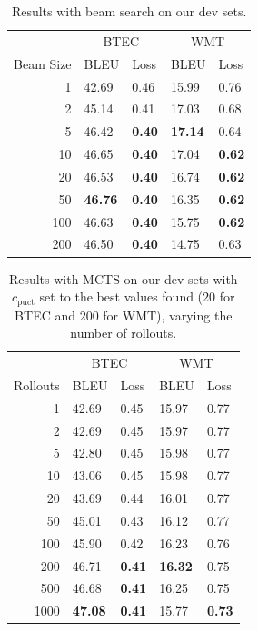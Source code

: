 \documentclass[11pt,a4paper]{article}
\begin{document}
\begin{table}
\centering
\begin{tabular}{r l l l l}
\toprule
& \multicolumn{2}{c}{BTEC} & \multicolumn{2}{c}{WMT} \\
\cmidrule(l{2pt}r{2pt}){2-3}\cmidrule(l{2pt}r{2pt}){4-5}
Beam Size & BLEU & Loss & BLEU & Loss \\
\midrule
1 & 42.69 & 0.46 & 15.99 & 0.76 \\
2 & 45.14 & 0.41 & 17.03 & 0.68 \\
5 & 46.42 & \textbf{0.40} & \textbf{17.14} & 0.64 \\
10 & 46.65 & \textbf{0.40} & 17.04 & \textbf{0.62} \\
20 & 46.53 & \textbf{0.40} & 16.74 & \textbf{0.62} \\
50 & \textbf{46.76} & \textbf{0.40} & 16.35 & \textbf{0.62} \\
100 & 46.63 & \textbf{0.40} & 15.75 & \textbf{0.62} \\
200 & 46.50 & \textbf{0.40} & 14.75 & 0.63 \\
\bottomrule
\end{tabular}
\caption{Results with beam search on our dev sets.}
\label{tab:btec_bs_results}
\end{table}

\begin{table}
\centering
\begin{tabular}{r l l l l}
\toprule
& \multicolumn{2}{c}{BTEC} & \multicolumn{2}{c}{WMT} \\
\cmidrule(l{2pt}r{2pt}){2-3}\cmidrule(l{2pt}r{2pt}){4-5}
Rollouts & BLEU & Loss & BLEU & Loss \\
\midrule
1 & 42.69 & 0.45 & 15.97 & 0.77 \\
2 & 42.69 & 0.45 & 15.97 & 0.77 \\
5 & 42.80 & 0.45 & 15.98 & 0.77 \\
10 & 43.06 & 0.45 & 15.98 & 0.77 \\
20 & 43.69 & 0.44 & 16.01 & 0.77 \\
50 & 45.01 & 0.43 & 16.12 & 0.77 \\
100 & 45.90 & 0.42 & 16.23 & 0.76 \\
200 & 46.71 & \textbf{0.41} & \textbf{16.32} & 0.75 \\
500 & 46.68 & \textbf{0.41} & 16.25 & 0.75 \\
1000 & \textbf{47.08} & \textbf{0.41} & 15.77 & \textbf{0.73} \\
\bottomrule
\end{tabular}
\caption{Results with MCTS on our dev sets with $c_{\text{puct}}$ set to the best values found ($20$ for BTEC and $200$ for WMT), varying the number of rollouts.}
\label{tab:btec_mcts_rollouts}
\end{table}
\end{document}
